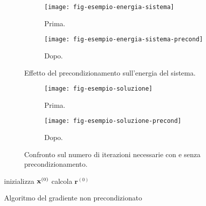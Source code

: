 \begin{figure}[htpb]
     \centering
     \begin{subfigure}[b]{0.45\textwidth}
         \centering
         \texttt{[image: fig-esempio-energia-sistema]}
         \caption{Prima.}
     \end{subfigure}
     \hfill
     \begin{subfigure}[b]{0.45\textwidth}
         \centering
         \texttt{[image: fig-esempio-energia-sistema-precond]}
         \caption{Dopo.}
     \end{subfigure}
        \caption{Effetto del precondizionamento sull'energia del sistema.}
        \label{fig:effetto-precondizionamento}
\end{figure}

\begin{figure}[htpb]
     \centering
     \begin{subfigure}[b]{0.45\textwidth}
         \centering
         \texttt{[image: fig-esempio-soluzione]}
         \caption{Prima.}
     \end{subfigure}
     \hfill
     \begin{subfigure}[b]{0.45\textwidth}
         \centering
         \texttt{[image: fig-esempio-soluzione-precond]}
         \caption{Dopo.}
     \end{subfigure}
        \caption{Confronto sul numero di iterazioni necessarie con e senza precondizionamento.}
        \label{fig:effetto-precondizionamento-soluzione}
\end{figure}

\begin{algo}
	inizializza $\mathbf{x}^{(0)}$\;
	calcola $\mathbf{r}^{(0)}$\;
	\caption{Algoritmo del gradiente non precondizionato}
\end{algo}


